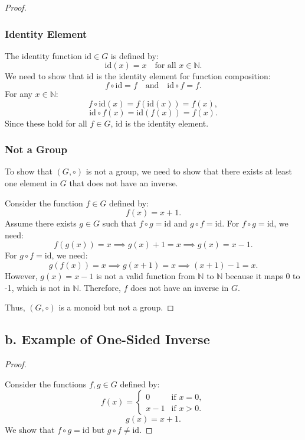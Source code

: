\documentclass[12pt]{amsart}
\theoremstyle{definition}
\numberwithin{equation}{section}
\begin{document}
\begin{exercise}{5}
\begin{proof}
\subsubsection*{Identity Element}
The identity function \(\text{id} \in G\) is defined by:
\[
\text{id}(x) = x \quad \text{for all } x \in \mathbb{N}.
\]
We need to show that \(\text{id}\) is the identity element for function composition:
\[
f \circ \text{id} = f \quad \text{and} \quad \text{id} \circ f = f.
\]
For any \(x \in \mathbb{N}\):
\[
f \circ \text{id}(x) = f(\text{id}(x)) = f(x),
\]
\[
\text{id} \circ f (x) = \text{id}(f(x)) = f(x).
\]
Since these hold for all \(f \in G\), \(\text{id}\) is the identity element.

\subsubsection*{Not a Group}
To show that \((G, \circ)\) is not a group, we need to show that there exists at least one element in \(G\) that does not have an inverse.

Consider the function \(f \in G\) defined by:
\[
f(x) = x+1.
\]
Assume there exists \(g \in G\) such that \(f \circ g = \text{id}\) and \(g \circ f = \text{id}\). For \(f \circ g = \text{id}\), we need:
\[
f(g(x)) = x \implies g(x)+1 = x \implies g(x) = x-1.
\]
For \(g \circ f = \text{id}\), we need:
\[
g(f(x)) = x \implies g(x+1) = x \implies (x+1)-1 = x.
\]
However, \(g(x) = x-1\) is not a valid function from \(\mathbb{N}\) to \(\mathbb{N}\) because it maps 0 to -1, which is not in \(\mathbb{N}\). Therefore, \(f\) does not have an inverse in \(G\).

Thus, \((G, \circ)\) is a monoid but not a group.

\end{proof}

\subsection*{\textbf{b. Example of One-Sided Inverse}}

\begin{proof} \( \)

Consider the functions \(f, g \in G\) defined by:
\[
f(x) = \begin{cases}
0 & \text{if } x = 0, \\
x-1 & \text{if } x > 0.
\end{cases}
\]
\[
g(x) = x+1.
\]
We show that \(f \circ g = \text{id}\) but \(g \circ f \neq \text{id}\).


\end{proof}
\end{exercise}
\end{document}
